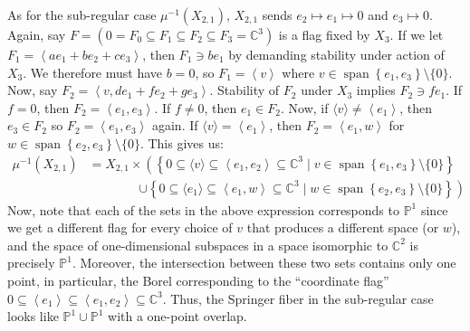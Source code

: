 \documentclass[11pt]{article}
\newcommand{\C}{\mathbb{C}}
\newcommand{\bP}{\mathbb{P}}
\newcommand{\Sp}{\operatorname{span}}
\theoremstyle{definition}
\numberwithin{equation}{section} %
\begin{document}
\begin{example}
    \noindent As for the sub-regular case $\mu^{-1}\left(X_{2,1}\right)$, $X_{2,1}$ sends $e_2\mapsto e_1\mapsto 0$ and $e_3\mapsto 0$. Again, say $F=\left(0 = F_0\subseteq F_1\subseteq F_2\subseteq F_3 = \C^3\right)$ is a flag fixed by $X_3$. If we let $F_1 = \left\langle ae_1+be_2+ce_3\right\rangle$, then $F_1 \ni be_1$ by demanding stability under action of $X_3$. We therefore must have $b=0$, so $F_1 = \left\langle v\right\rangle$ where $v\in \Sp \left\{e_1,e_3\right\} \setminus \{0\}$. Now, say $F_2 = \left\langle v, de_1 +fe_2+ge_3\right\rangle$. Stability of $F_2$ under $X_3$ implies $F_2 \ni fe_1$. If $f=0$, then $F_2 = \left\langle e_1,e_3\right\rangle$. If $f\neq 0$, then $e_1\in F_2$. Now, if $\langle v\rangle \neq \left\langle e_1\right\rangle$, then $e_3\in F_2$ so $F_2 = \left\langle e_1, e_3\right\rangle$ again. If $\langle v\rangle = \left\langle e_1\right\rangle$, then $F_2 = \left\langle e_1, w\right\rangle$ for $w\in \Sp\left\{e_2,e_3\right\}\setminus \{0\}$. This gives us:
    \begin{align*}
    \mu^{-1}\left(X_{2,1}\right) &= X_{2,1} \times \left(\left\{0\subseteq \langle v\rangle \subseteq \left\langle e_1,e_2\right\rangle \subseteq \C^3 \mid v\in \Sp\left\{e_1,e_3\right\}\setminus \{0\}\right\} \right.\\
    &\qquad\qquad \left.\cup \left\{0\subseteq \langle e_1\rangle \subseteq \left\langle e_1,w\right\rangle \subseteq \C^3 \mid w\in \Sp\left\{e_2,e_3\right\}\setminus \{0\}\right\} \right)
    \end{align*}
    Now, note that each of the sets in the above expression corresponds to $\bP^1$ since we get a different flag for every choice of $v$ that produces a different space (or $w$), and the space of one-dimensional subspaces in a space isomorphic to $\C^2$ is precisely $\bP^1$. Moreover, the intersection between these two sets contains only one point, in particular, the Borel corresponding to the ``coordinate flag'' $0\subseteq \left\langle e_1\right\rangle \subseteq \left\langle e_1, e_2\right\rangle \subseteq \C^3$. Thus, the Springer fiber in the sub-regular case looks like $\bP^1\cup \bP^1$ with a one-point overlap.
\end{example}  
\end{document}
